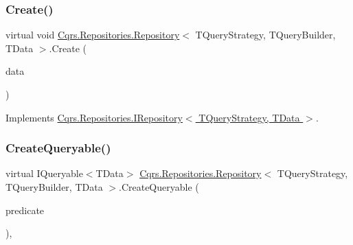 \mbox{\label{classCqrs_1_1Repositories_1_1Repository_a2af8103cc2946317f8ee9ede643bbc68}} 
\subsubsection{\texorpdfstring{Create()}{Create()}\hspace{0.1cm}{\footnotesize\ttfamily [2/2]}}
{\footnotesize\ttfamily virtual void \hyperlink{classCqrs_1_1Repositories_1_1Repository}{Cqrs.\+Repositories.\+Repository}$<$ T\+Query\+Strategy, T\+Query\+Builder, T\+Data $>$.Create (\begin{DoxyParamCaption}\item[{I\+Enumerable$<$ T\+Data $>$}]{data }\end{DoxyParamCaption})\hspace{0.3cm}{\ttfamily [virtual]}}



Implements \hyperlink{interfaceCqrs_1_1Repositories_1_1IRepository_ae3481fb2ecb0146308e07a9dd6af8c14}{Cqrs.\+Repositories.\+I\+Repository$<$ T\+Query\+Strategy, T\+Data $>$}.

\mbox{\label{classCqrs_1_1Repositories_1_1Repository_ab95fc66b24e8359a1e2f48a3ca2f14c1}} 
\subsubsection{\texorpdfstring{Create\+Queryable()}{CreateQueryable()}}
{\footnotesize\ttfamily virtual I\+Queryable$<$T\+Data$>$ \hyperlink{classCqrs_1_1Repositories_1_1Repository}{Cqrs.\+Repositories.\+Repository}$<$ T\+Query\+Strategy, T\+Query\+Builder, T\+Data $>$.Create\+Queryable (\begin{DoxyParamCaption}\item[{Expression$<$ Func$<$ T\+Data, bool $>$$>$}]{predicate }\end{DoxyParamCaption})\hspace{0.3cm}{\ttfamily [protected]}, {\ttfamily [virtual]}}



